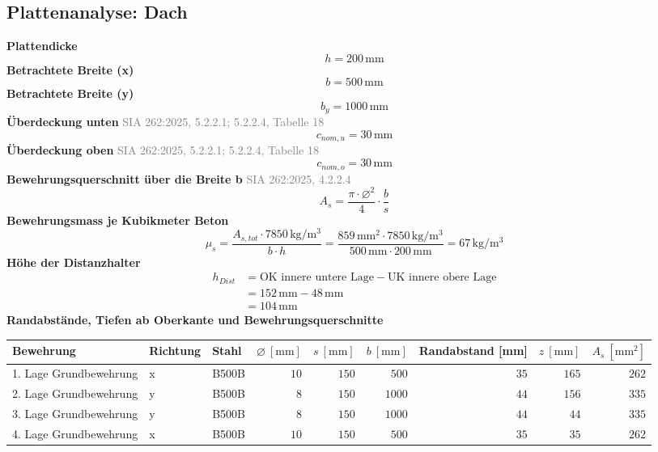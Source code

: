 \documentclass[11pt,a4paper]{article}
\newcommand{\normref}[1]{{\small\textcolor{gray}{#1}}}
\begin{document}
\subsection{Plattenanalyse: Dach}
\noindent\textbf{Plattendicke}
\begin{equation*}
h = 200\,\mathrm{mm}
\end{equation*}
\noindent\textbf{Betrachtete Breite (x)}
\begin{equation*}
b = 500\,\mathrm{mm}
\end{equation*}
\noindent\textbf{Betrachtete Breite (y)}
\begin{equation*}
b_y = 1000\,\mathrm{mm}
\end{equation*}
\noindent\textbf{Überdeckung unten} \hfill \normref{SIA 262:2025, 5.2.2.1; 5.2.2.4, Tabelle 18}
\begin{equation*}
c_{nom,u} = 30\,\mathrm{mm}
\end{equation*}
\noindent\textbf{Überdeckung oben} \hfill \normref{SIA 262:2025, 5.2.2.1; 5.2.2.4, Tabelle 18}
\begin{equation*}
c_{nom,o} = 30\,\mathrm{mm}
\end{equation*}
\noindent\textbf{Bewehrungsquerschnitt über die Breite b} \hfill \normref{SIA 262:2025, 4.2.2.4}
\begin{equation*}
A_s = \frac{\pi \cdot \varnothing^{2}}{4} \cdot \frac{b}{s}
\end{equation*}
\noindent\textbf{Bewehrungsmass je Kubikmeter Beton}
\begin{equation*}
\mu_s = \frac{A_{s,tot} \cdot 7850\,\mathrm{kg}/\mathrm{m}^{3}}{b \cdot h} = \frac{859\,\mathrm{mm}^{2} \cdot 7850\,\mathrm{kg}/\mathrm{m}^{3}}{500\,\mathrm{mm} \cdot 200\,\mathrm{mm}} = 67\,\mathrm{kg}/\mathrm{m}^{3}
\end{equation*}
\noindent\textbf{Höhe der Distanzhalter}
\begin{equation*}
\begin{aligned}
  h_{Dist} &= \text{OK innere untere Lage} - \text{UK innere obere Lage} \\
  &= 152\,\mathrm{mm} - 48\,\mathrm{mm} \\
  &= 104\,\mathrm{mm}
\end{aligned}
\end{equation*}
\noindent\textbf{Randabstände, Tiefen ab Oberkante und Bewehrungsquerschnitte}
\begin{longtable}{lllrrrrrr}
\hline
Bewehrung & Richtung & Stahl & $\varnothing\ [\mathrm{mm}]$ & $s\ [\mathrm{mm}]$ & $b\ [\mathrm{mm}]$ & Randabstand [mm] & $z\ [\mathrm{mm}]$ & $A_s\ [\mathrm{mm}^2]$ \\
\hline
\endhead
1. Lage Grundbewehrung & x & B500B & $10$ & $150$ & $500$ & $35$ & $165$ & $262$ \\
2. Lage Grundbewehrung & y & B500B & $8$ & $150$ & $1000$ & $44$ & $156$ & $335$ \\
3. Lage Grundbewehrung & y & B500B & $8$ & $150$ & $1000$ & $44$ & $44$ & $335$ \\
4. Lage Grundbewehrung & x & B500B & $10$ & $150$ & $500$ & $35$ & $35$ & $262$ \\
\hline
\end{longtable}
\end{document}

